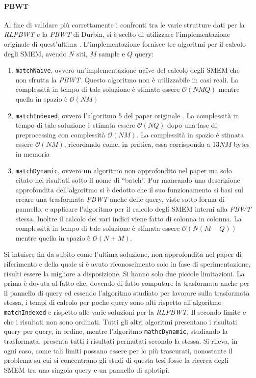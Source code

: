 \paragraph{PBWT}
Al fine di validare più correttamente i confronti tra le varie strutture dati
per la \textit{RLPBWT} e la \textit{PBWT} di Durbin, si è scelto di utilizzare
l'implementazione originale di quest'ultima \cite{durbin_gh}. L'implementazione
fornisce tre algoritmi per il calcolo degli SMEM, avendo $N$ siti, $M$ sample e
$Q$ query:
\begin{enumerate}
  \item \texttt{matchNaive}, ovvero un'implementazione na\"{i}ve del calcolo
  degli SMEM che non sfrutta la \textit{PBWT}. Questo algoritmo non è
  utilizzabile in casi reali. La complessità in tempo di tale 
  soluzione è stimata essere $\mathcal{O}(NMQ)$ mentre quella in spazio è
  $\mathcal{O}(NM)$
  \item \texttt{matchIndexed}, ovvero l'algoritmo 5 del paper originale
  \cite{pbwt}. La complessità in tempo di tale 
  soluzione è stimata essere $\mathcal{O}(NQ)$ dopo una fase di preprocessing
  con complessità $\mathcal{O}(NM)$. La complessità in spazio è stimata essere
  $\mathcal{O}(NM)$, ricordando come, in pratica, essa corrisponda a $13NM$
  bytes in memoria
  \item \texttt{matchDynamic}, ovvero un algoritmo non approfondito nel paper ma
  solo citato nei risultati sotto il nome di ``batch''. Pur mancando una
  descrizione approfondita dell'algoritmo si è dedotto che il suo funzionamento
  si basi sul creare una trasformata \textit{PBWT} anche delle query, viste
  sotto forma di pannello, e applicare l'algoritmo per il calcolo degli SMEM
  interni alla \textit{PBWT} stessa. Inoltre il calcolo dei vari indici viene
  fatto di colonna in colonna. La complessità in tempo di tale 
  soluzione è stimata essere $\mathcal{O}(N(M+Q))$ mentre quella in spazio è
  $\mathcal{O}(N+M)$. 
\end{enumerate}
Si intuisce fin da subito come l'ultima soluzione, non approfondita nel paper di
riferimento e della quale si è avuto riconoscimento solo in fase di
sperimentazione, risulti essere la migliore a disposizione. Si hanno solo due
piccole limitazioni. La prima è dovuta al fatto che, dovendo di fatto computare
la trasformata anche per il pannello di query ed essendo l'algoritmo studiato
per lavorare sulla trasformata stessa, i tempi di calcolo per poche query sono
alti rispetto all'algoritmo \texttt{matchIndexed} e rispetto alle varie
soluzioni per la \textit{RLPBWT}. Il secondo limite e che i risultati non sono
ordinati. Tutti gli altri algoritmi presentano i risultati query per query, in
ordine, mentre l'algoritmo \texttt{mathcDynamic}, studiando la trasformata,
presenta tutti i risultati permutati secondo la stessa. Si rileva, in ogni caso,
come tali limiti possano essere per lo più trascurati, nonostante il problema su
cui si concentrano gli studi di questa tesi fosse la ricerca degli SMEM tra una
singola query e un pannello di aplotipi.
